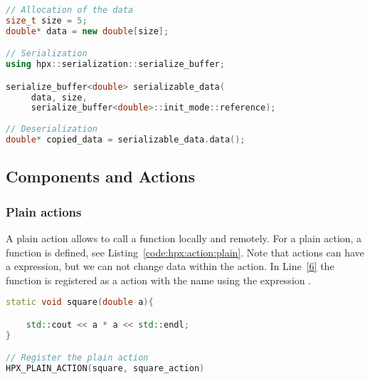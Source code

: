 \begin{lstlisting}[language=c++,caption={Serialization in HPX.\label{code:hpx:serialization}},float,floatplacement=tb]
// Allocation of the data
size_t size = 5;
double* data = new double[size];

// Serialization
using hpx::serialization::serialize_buffer;

serialize_buffer<double> serializable_data(
     data, size,
     serialize_buffer<double>::init_mode::reference);
     
// Deserialization
double* copied_data = serializable_data.data();
\end{lstlisting}


\subsection{Components and Actions}
\label{sec:hpx:components:actions}


\subsubsection{Plain actions}
A plain action allows to call a  function locally and remotely. For a plain action, a  function   is defined, see Listing~\ref{code:hpx:action:plain}. Note that actions can have a  expression, but we can not change data within the action. In Line~\ref{6} the function  is registered as a action with the name  using the expression .



\begin{lstlisting}[language=c++,caption={Plain actions in HPX.\label{code:hpx:action:plain}},float,floatplacement=tb]
static void square(double a){

	std::cout << a * a << std::endl;
}

// Register the plain action
HPX_PLAIN_ACTION(square, square_action)
\end{lstlisting}



